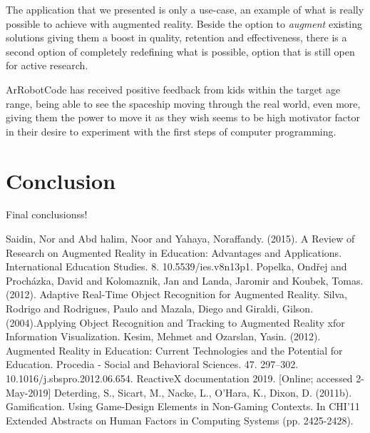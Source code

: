\documentclass[12 pct]{report}
\begin{document}
The application that we presented is only a use-case, an example of what is really possible to achieve with augmented reality. Beside the option to \textit{augment} existing solutions giving them a boost in quality, retention and effectiveness, there is a second option of completely redefining what is possible, option that is still open for active research.

ArRobotCode has received positive feedback from kids within the target age range, being able to see the spaceship moving through the real world, even more, giving them the power to move it as they wish seems to be high motivator factor in their desire to experiment with the first steps of computer programming.


\chapter{Conclusion}
Final conclusionss!




\begin{thebibliography}{3}
Saidin, Nor and Abd halim, Noor and Yahaya, Noraffandy. (2015). A Review of Research on Augmented Reality in Education: Advantages and Applications. International Education Studies. 8. 10.5539/ies.v8n13p1. 
Popelka, Ondřej and Procházka, David and Kolomaznik, Jan and Landa, Jaromir and Koubek, Tomas. (2012). Adaptive Real-Time Object Recognition for Augmented Reality. 
Silva, Rodrigo and Rodrigues, Paulo and Mazala, Diego and Giraldi, Gilson. (2004).Applying Object Recognition and Tracking to Augmented Reality xfor Information Visualization. 
Kesim, Mehmet and Ozarslan, Yasin. (2012). Augmented Reality in Education: Current Technologies and the Potential for Education. Procedia - Social and Behavioral Sciences. 47. 297–302. 10.1016/j.sbspro.2012.06.654. 
ReactiveX documentation 2019. [Online; accessed 2-May-2019]
Deterding, S., Sicart, M., Nacke, L., O'Hara, K., Dixon, D. (2011b). Gamification. Using Game-Design Elements in Non-Gaming Contexts. In CHI'11 Extended Abstracts on Human Factors in Computing Systems (pp. 2425-2428).
\end{thebibliography}
\end{document}
